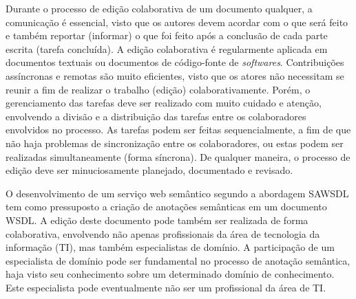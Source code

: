 Durante o processo de edição colaborativa de um documento qualquer, a comunicação é essencial, visto que os autores devem acordar com o que será feito e também reportar (informar) o que foi feito após a conclusão de cada parte escrita (tarefa concluída). A edição colaborativa é regularmente aplicada em documentos textuais ou documentos de código-fonte de \textit{softwares}. Contribuições assíncronas e remotas são muito eficientes, visto que os atores não necessitam se reunir a fim de realizar o trabalho (edição) colaborativamente. Porém, o gerenciamento das tarefas deve ser realizado com muito cuidado e atenção, envolvendo a divisão e a distribuição das tarefas entre os colaboradores envolvidos no processo. As tarefas podem ser feitas sequencialmente, a fim de que não haja problemas de sincronização entre os colaboradores, ou estas podem ser realizadas simultaneamente (forma síncrona). De qualquer maneira, o processo de edição deve ser minuciosamente planejado, documentado e revisado.

O desenvolvimento de um serviço web semântico segundo a abordagem SAWSDL tem como pressuposto a criação de anotações semânticas em um documento WSDL. A edição deste documento pode também ser realizada de forma colaborativa, envolvendo não apenas profissionais da área de tecnologia da informação (TI), mas também especialistas de domínio. A participação de um especialista de domínio pode ser fundamental no processo de anotação semântica, haja visto seu conhecimento sobre um determinado domínio de conhecimento. Este especialista pode eventualmente não ser um profissional da área de TI.





